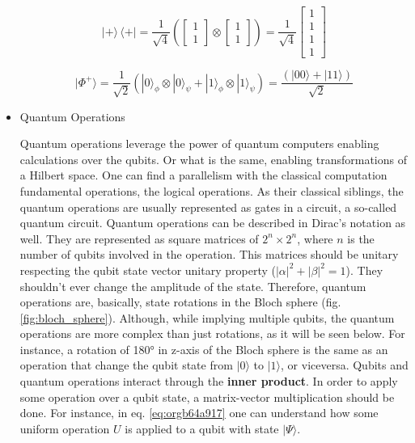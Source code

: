 \begin{itemize}
\begin{equation}
\label{eq:orga5b6891}
|+\rangle \,\langle + | = \frac{1}{\sqrt{4}} \left( \begin{bmatrix}1 \\ 1 \end{bmatrix} \otimes \begin{bmatrix}1 \\ 1 \end{bmatrix} \right) = \frac{1}{\sqrt{4}} \begin{bmatrix}1 \\ 1 \\ 1 \\ 1\end{bmatrix} 
\end{equation}

\begin{equation}
\label{eq:org5dc8bea}
|\Phi ^{+}\rangle =\frac  {1}{\sqrt  {2}}(|0\rangle _{\phi}\otimes |0\rangle _{\psi}+|1\rangle _{\phi}\otimes |1\rangle _{\psi}) =  \frac{(|00\rangle +|11\rangle )} {\sqrt {2}}
\end{equation}


\item Quantum Operations
\label{sec:orge95d626}

Quantum operations leverage the power of quantum computers enabling calculations over the qubits.
Or what is the same, enabling transformations of a Hilbert space.
One can find a parallelism with the classical computation fundamental operations, the logical operations.
As their classical siblings, the quantum operations are usually represented as gates in a circuit, a so-called quantum circuit.
Quantum operations can be described in Dirac's notation as well.
They are represented as square matrices of \(2^{n} \times 2^{n}\), where \(n\) is the number of qubits involved in the operation.
This matrices should be unitary respecting the qubit state vector unitary property (\(|\alpha|^2 + |\beta|^2 = 1\)).
They shouldn't ever change the amplitude of the state.
Therefore, quantum operations are, basically, state rotations in the Bloch sphere (fig. \ref{fig:bloch_sphere}).
Although, while implying multiple qubits, the quantum operations are more complex than just rotations, as it will be seen below.
For instance, a rotation of 180° in z-axis of the Bloch sphere is the same as an operation that change the qubit state from \(| 0 \rangle\) to \(| 1 \rangle\), or viceversa.
Qubits and quantum operations interact through the \textbf{inner product}.
In order to apply some operation over a qubit state, a matrix-vector multiplication should be done.
For instance, in eq. \ref{eq:orgb64a917} one can understand how some uniform operation \(U\) is applied to a qubit with state \(| \Psi \rangle\).


\end{itemize}
